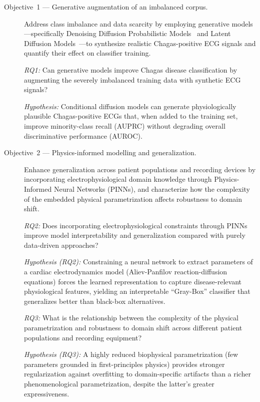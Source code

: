 \begin{description}
    \item[Objective~1 --- Generative augmentation of an imbalanced corpus.]
    Address class imbalance and data scarcity by employing generative models---specifically Denoising Diffusion Probabilistic Models~\cite{ho2020denoising} and Latent Diffusion Models~\cite{rombach2022highresolution}---to synthesize realistic Chagas-positive ECG signals and quantify their effect on classifier training.

    \textit{RQ1:} Can generative models improve Chagas disease classification by augmenting the severely imbalanced training data with synthetic ECG signals?

    \textit{Hypothesis:} Conditional diffusion models can generate physiologically plausible Chagas-positive ECGs that, when added to the training set, improve minority-class recall (AUPRC) without degrading overall discriminative performance (AUROC).

    \item[Objective~2 --- Physics-informed modelling and generalization.]
    Enhance generalization across patient populations and recording devices by incorporating electrophysiological domain knowledge through Physics-Informed Neural Networks (PINNs), and characterize how the complexity of the embedded physical parametrization affects robustness to domain shift.

    \textit{RQ2:} Does incorporating electrophysiological constraints through PINNs improve model interpretability and generalization compared with purely data-driven approaches?

    \textit{Hypothesis (RQ2):} Constraining a neural network to extract parameters of a cardiac electrodynamics model (Aliev-Panfilov reaction-diffusion equations) forces the learned representation to capture disease-relevant physiological features, yielding an interpretable ``Gray-Box'' classifier that generalizes better than black-box alternatives.

    \textit{RQ3:} What is the relationship between the complexity of the physical parametrization and robustness to domain shift across different patient populations and recording equipment?

    \textit{Hypothesis (RQ3):} A highly reduced biophysical parametrization (few parameters grounded in first-principles physics) provides stronger regularization against overfitting to domain-specific artifacts than a richer phenomenological parametrization, despite the latter's greater expressiveness.


\end{description}
